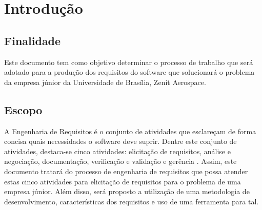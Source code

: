\chapter[Introdução]{Introdução}

\section{Finalidade}
Este documento tem como objetivo determinar o processo de trabalho que será adotado para a produção dos requisitos do software que solucionará o problema da empresa júnior da Universidade de Brasília, Zenit Aerospace.
\section{Escopo}
A Engenharia de Requisitos é o conjunto de atividades que esclareçam de forma concisa quais necessidades o software deve suprir. Dentre este conjunto de atividades, destaca-se cinco atividades: elicitação de requisitos, análise e negociação, documentação, verificação e validação e gerência \cite{thayer1997}. Assim, este documento tratará do processo de engenharia de requisitos que possa atender estas cinco atividades para elicitação de requisitos para o problema de uma empresa júnior. Além disso, será proposto a utilização de uma metodologia de desenvolvimento, características dos requisitos e uso de uma ferramenta para tal.

